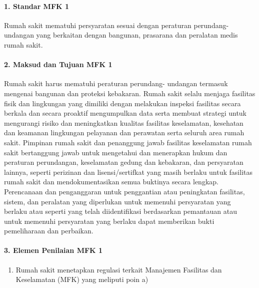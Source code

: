 \documentclass[
]{book}
\providecommand{\tightlist}{%
  \setlength{\itemsep}{0pt}\setlength{\parskip}{0pt}}
\begin{document}
\hypertarget{standar-mfk-1}{%
\paragraph*{1. Standar MFK 1}\label{standar-mfk-1}}

Rumah sakit mematuhi persyaratan sesuai dengan peraturan perundang-undangan yang berkaitan dengan bangunan, prasarana dan peralatan medis rumah sakit.

\hypertarget{maksud-dan-tujuan-mfk-1}{%
\paragraph*{2. Maksud dan Tujuan MFK 1}\label{maksud-dan-tujuan-mfk-1}}

Rumah sakit harus mematuhi peraturan perundang- undangan termasuk mengenai bangunan dan proteksi kebakaran. Rumah sakit selalu menjaga fasilitas fisik dan lingkungan yang dimiliki dengan melakukan inspeksi fasilitas secara berkala dan secara proaktif mengumpulkan data serta membuat strategi untuk mengurangi risiko dan meningkatkan kualitas fasilitas keselamatan, kesehatan dan keamanan lingkungan pelayanan dan perawatan serta seluruh area rumah sakit.
Pimpinan rumah sakit dan penanggung jawab fasilitas keselamatan rumah sakit bertanggung jawab untuk mengetahui dan menerapkan hukum dan peraturan perundangan, keselamatan gedung dan kebakaran, dan persyaratan lainnya, seperti perizinan dan lisensi/sertifkat yang masih berlaku untuk fasilitas rumah sakit dan mendokumentasikan semua buktinya secara lengkap.
Perencanaan dan penganggaran untuk penggantian atau peningkatan fasilitas, sistem, dan peralatan yang diperlukan untuk memenuhi persyaratan yang berlaku atau seperti yang telah diidentifikasi berdasarkan pemantauan atau untuk memenuhi persyaratan yang berlaku dapat memberikan bukti pemeliharaan dan perbaikan.

\hypertarget{elemen-penilaian-mfk-1}{%
\paragraph*{3. Elemen Penilaian MFK 1}\label{elemen-penilaian-mfk-1}}

\begin{enumerate}
\def\labelenumi{\alph{enumi}.}
\tightlist
\item
  Rumah sakit menetapkan regulasi terkait Manajemen Fasilitas dan Keselamatan (MFK) yang meliputi poin a)
\end{enumerate}
\end{document}
